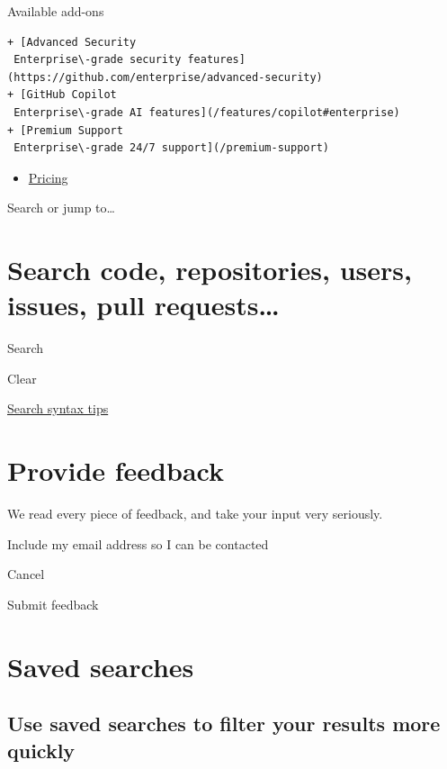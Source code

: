\documentclass[
  letterpaper,
]{book}
\providecommand{\tightlist}{%
  \setlength{\itemsep}{0pt}\setlength{\parskip}{0pt}}\usepackage{longtable,booktabs,array}
\begin{document}
Available add-ons

\begin{verbatim}
+ [Advanced Security
 Enterprise\-grade security features](https://github.com/enterprise/advanced-security)
+ [GitHub Copilot
 Enterprise\-grade AI features](/features/copilot#enterprise)
+ [Premium Support
 Enterprise\-grade 24/7 support](/premium-support)
\end{verbatim}

\begin{itemize}
\tightlist
\item
  \href{https://github.com/pricing}{Pricing}
\end{itemize}

Search or jump to\ldots{}


\chapter{Search code, repositories, users, issues, pull
requests\ldots{}}\label{search-code-repositories-users-issues-pull-requests-2}

Search

Clear

\href{https://docs.github.com/search-github/github-code-search/understanding-github-code-search-syntax}{Search
syntax tips}


\chapter{Provide feedback}\label{provide-feedback-2}

We read every piece of feedback, and take your input very seriously.

Include my email address so I can be contacted

Cancel

Submit feedback


\chapter{Saved searches}\label{saved-searches-2}

\section{Use saved searches to filter your results more
quickly}\label{use-saved-searches-to-filter-your-results-more-quickly-2}
\end{document}
